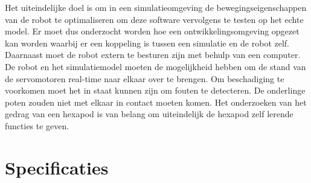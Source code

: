 \documentclass[10pt,a4paper]{article}
\begin{document}
Het uiteindelijke doel is om in een simulatieomgeving de bewegingseigenschappen van de robot te optimaliseren om deze software vervolgens te testen op het echte model. Er moet dus onderzocht worden hoe een ontwikkelingsomgeving opgezet kan worden waarbij er een koppeling is tussen een simulatie en de robot zelf. Daarnaast moet de robot extern te besturen zijn met behulp van een computer. De robot en het simulatiemodel moeten de mogelijkheid hebben om de stand van de servomotoren real-time naar elkaar over te brengen. Om beschadiging te voorkomen moet het in staat kunnen zijn om fouten te detecteren. De onderlinge poten zouden niet met elkaar in contact moeten komen. Het onderzoeken van het gedrag van een hexapod is van belang om uiteindelijk de hexapod zelf lerende functies te geven.
\newpage

\section{Specificaties}
\end{document}
